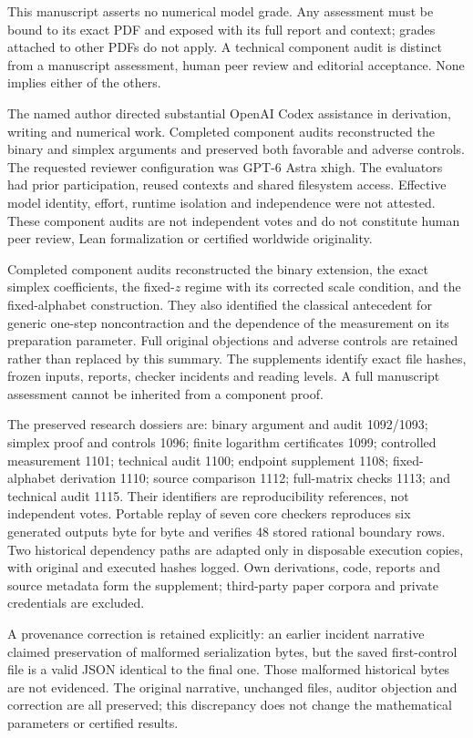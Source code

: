 \documentclass[11pt]{article}
\theoremstyle{remark}\newtheorem{remark}[theorem]{Remark}
\begin{document}
This manuscript asserts no numerical model grade. Any assessment must be bound to its exact PDF and exposed with its full report and context; grades attached to other PDFs do not apply. A technical component audit is distinct from a manuscript assessment, human peer review and editorial acceptance. None implies either of the others.

The named author directed substantial OpenAI Codex assistance in derivation, writing and numerical work. Completed component audits reconstructed the binary and simplex arguments and preserved both favorable and adverse controls. The requested reviewer configuration was GPT-6 Astra xhigh. The evaluators had prior participation, reused contexts and shared filesystem access. Effective model identity, effort, runtime isolation and independence were not attested. These component audits are not independent votes and do not constitute human peer review, Lean formalization or certified worldwide originality.

Completed component audits reconstructed the binary extension, the exact simplex coefficients, the fixed-$z$ regime with its corrected scale condition, and the fixed-alphabet construction. They also identified the classical antecedent for generic one-step noncontraction and the dependence of the measurement on its preparation parameter. Full original objections and adverse controls are retained rather than replaced by this summary. The supplements identify exact file hashes, frozen inputs, reports, checker incidents and reading levels. A full manuscript assessment cannot be inherited from a component proof.

The preserved research dossiers are: binary argument and audit 1092/1093; simplex proof and controls 1096; finite logarithm certificates 1099; controlled measurement 1101; technical audit 1100; endpoint supplement 1108; fixed-alphabet derivation 1110; source comparison 1112; full-matrix checks 1113; and technical audit 1115. Their identifiers are reproducibility references, not independent votes. Portable replay of seven core checkers reproduces six generated outputs byte for byte and verifies 48 stored rational boundary rows. Two historical dependency paths are adapted only in disposable execution copies, with original and executed hashes logged. Own derivations, code, reports and source metadata form the supplement; third-party paper corpora and private credentials are excluded.

A provenance correction is retained explicitly: an earlier incident narrative claimed preservation of malformed serialization bytes, but the saved first-control file is a valid JSON identical to the final one. Those malformed historical bytes are not evidenced. The original narrative, unchanged files, auditor objection and correction are all preserved; this discrepancy does not change the mathematical parameters or certified results.
\end{document}
